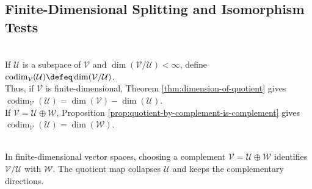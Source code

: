 \subsection{Finite-Dimensional Splitting and Isomorphism Tests}
\begin{definition} \label{def:codimension-subspace} \\
If $\mathcal{U}$ is a subspace of $\mathcal{V}$ and $\dim(\mathcal{V}/\mathcal{U})<\infty$, define $\operatorname{codim}_{\mathcal{V}}(\mathcal{U})\defeq\dim(\mathcal{V}/\mathcal{U})$.\\
Thus, if $\mathcal{V}$ is finite-dimensional, Theorem \ref{thm:dimension-of-quotient} gives $\operatorname{codim}_{\mathcal{V}}(\mathcal{U})=\dim(\mathcal{V})-\dim(\mathcal{U})$.\\
If $\mathcal{V}=\mathcal{U}\oplus\mathcal{W}$, Proposition \ref{prop:quotient-by-complement-is-complement} gives $\operatorname{codim}_{\mathcal{V}}(\mathcal{U})=\dim(\mathcal{W})$.
\end{definition}

\begin{perspective} \label{per:quotients-split-over-fields} \\
In finite-dimensional vector spaces, choosing a complement $\mathcal{V}=\mathcal{U}\oplus\mathcal{W}$ identifies $\mathcal{V}/\mathcal{U}$ with $\mathcal{W}$. The quotient map collapses $\mathcal{U}$ and keeps the complementary directions.
\end{perspective}

